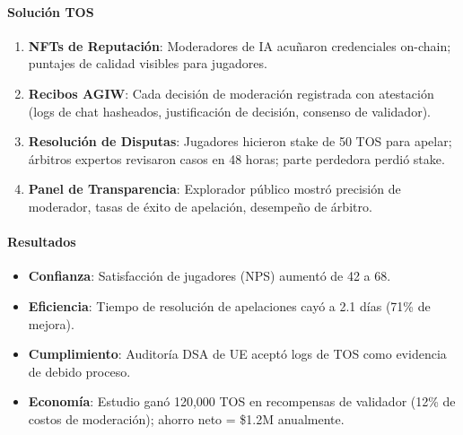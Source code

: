\documentclass[11pt]{article}
\begin{document}
\paragraph{Solución TOS}
\begin{enumerate}[noitemsep]
  \item \textbf{NFTs de Reputación}: Moderadores de IA acuñaron credenciales on-chain; puntajes de calidad visibles para jugadores.
  \item \textbf{Recibos AGIW}: Cada decisión de moderación registrada con atestación (logs de chat hasheados, justificación de decisión, consenso de validador).
  \item \textbf{Resolución de Disputas}: Jugadores hicieron stake de 50 TOS para apelar; árbitros expertos revisaron casos en 48 horas; parte perdedora perdió stake.
  \item \textbf{Panel de Transparencia}: Explorador público mostró precisión de moderador, tasas de éxito de apelación, desempeño de árbitro.
\end{enumerate}

\paragraph{Resultados}
\begin{itemize}[noitemsep]
  \item \textbf{Confianza}: Satisfacción de jugadores (NPS) aumentó de 42 a 68.
  \item \textbf{Eficiencia}: Tiempo de resolución de apelaciones cayó a 2.1 días (71\% de mejora).
  \item \textbf{Cumplimiento}: Auditoría DSA de UE aceptó logs de TOS como evidencia de debido proceso.
  \item \textbf{Economía}: Estudio ganó 120,000 TOS en recompensas de validador (12\% de costos de moderación); ahorro neto = \$1.2M anualmente.
\end{itemize}
\end{document}
